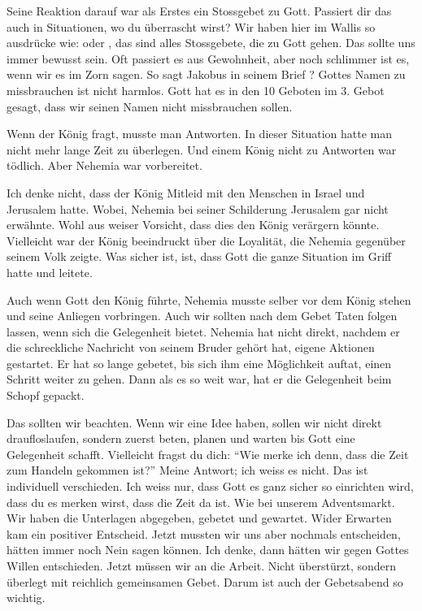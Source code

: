 \documentclass[fontsize=16pt]{mybib}
\begin{document}
Seine Reaktion darauf war als Erstes ein Stossgebet zu Gott. Passiert dir das auch in Situationen, wo du überrascht wirst? Wir haben hier im Wallis so ausdrücke wie:  oder , das sind alles Stossgebete, die zu Gott gehen. Das sollte uns immer bewusst sein. Oft passiert es aus Gewohnheit, aber noch schlimmer ist es, wenn wir es im Zorn sagen. So sagt Jakobus in seinem Brief ? Gottes Namen zu missbrauchen ist nicht harmlos. Gott hat es in den 10 Geboten im 3. Gebot  gesagt, dass wir seinen Namen nicht missbrauchen sollen.


Wenn der König fragt, musste man Antworten. In dieser Situation hatte man nicht mehr lange Zeit zu überlegen. Und einem König nicht zu Antworten war tödlich. Aber Nehemia war vorbereitet.

Ich denke nicht, dass der König Mitleid mit den Menschen in Israel und Jerusalem hatte. Wobei, Nehemia bei seiner Schilderung Jerusalem gar nicht erwähnte. Wohl aus weiser Vorsicht, dass dies den König verärgern könnte. Vielleicht war der König beeindruckt über die Loyalität, die Nehemia gegenüber seinem Volk zeigte. Was sicher ist, ist, dass Gott die ganze Situation im Griff hatte und leitete. 

Auch wenn Gott den König führte, Nehemia musste selber vor dem König stehen und seine Anliegen vorbringen. Auch wir sollten nach dem Gebet Taten folgen lassen, wenn sich die Gelegenheit bietet. Nehemia hat nicht direkt, nachdem er die schreckliche Nachricht von seinem Bruder gehört hat, eigene Aktionen gestartet. Er hat so lange gebetet, bis sich ihm eine Möglichkeit auftat, einen Schritt weiter zu gehen. Dann als es so weit war, hat er die Gelegenheit beim Schopf gepackt.

Das sollten wir beachten. Wenn wir eine Idee haben, sollen wir nicht direkt draufloslaufen, sondern zuerst beten, planen und warten bis Gott eine Gelegenheit schafft. Vielleicht fragst du dich: \enquote{Wie merke ich denn, dass die Zeit zum Handeln gekommen ist?} Meine Antwort; ich weiss es nicht. Das ist individuell verschieden. Ich weiss nur, dass Gott es ganz sicher so einrichten wird, dass du es merken wirst, dass die Zeit da ist. Wie bei unserem Adventsmarkt. Wir haben die Unterlagen abgegeben, gebetet und gewartet. Wider Erwarten kam ein positiver Entscheid. Jetzt mussten wir uns aber nochmals entscheiden, hätten immer noch Nein sagen können. Ich denke, dann hätten wir gegen Gottes Willen entschieden. Jetzt müssen wir an die Arbeit. Nicht überstürzt, sondern überlegt mit reichlich gemeinsamen Gebet. Darum ist auch der Gebetsabend so wichtig.
\end{document}
